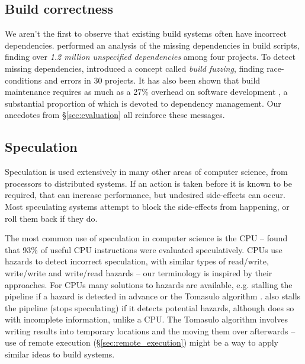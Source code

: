 \subsection{Build correctness}

We aren't the first to observe that existing build systems often have incorrect dependencies.  \citet{bezemer2017empirical} performed an analysis of the missing dependencies in \Make build scripts, finding over \emph{1.2 million unspecified dependencies} among four projects. To detect missing dependencies, \citet{detecting_incorrect_build_rules} introduced a concept called \emph{build fuzzing}, finding race-conditions and errors in 30 projects. It has also been shown that build maintenance requires as much as a 27\% overhead on software development \cite{build_maintenance}, a substantial proportion of which is devoted to dependency management. Our anecdotes from \S\ref{sec:evaluation} all reinforce these messages.

\subsection{Speculation}

Speculation is used extensively in many other areas of computer science, from processors to distributed systems. If an action is taken before it is known to be required, that can increase performance, but undesired side-effects can occur. Most speculating systems attempt to block the side-effects from happening, or roll them back if they do.

The most common use of speculation in computer science is the CPU -- \citet{swanson_cpu_speculation} found that 93\% of useful CPU instructions were evaluated speculatively. CPUs use hazards to detect incorrect speculation, with similar types of read/write, write/write and write/read hazards \cite{patterson_cpu_design} -- our terminology is inspired by their approaches. For CPUs many solutions to hazards are available, e.g. stalling the pipeline if a hazard is detected in advance or the Tomasulo algorithm \cite{tomasulo}. \Rattle also stalls the pipeline (stops speculating) if it detects potential hazards, although does so with incomplete information, unlike a CPU. The Tomasulo algorithm involves writing results into temporary locations and the moving them over afterwards -- use of remote execution (\S\ref{sec:remote_execution}) might be a way to apply similar ideas to build systems.

